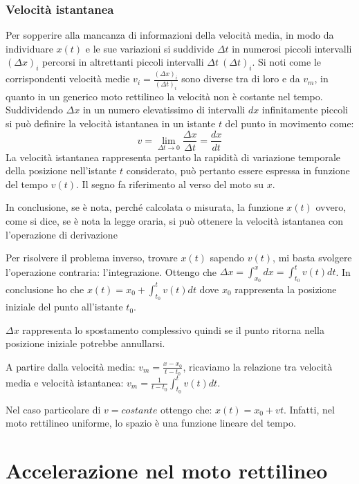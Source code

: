 \documentclass[class=book, crop=false, oneside, 12pt]{standalone}
\begin{document}
    \subsubsection{Velocit\`a istantanea}
    Per sopperire alla mancanza di informazioni della velocit\`a media, in modo da individuare \(x(t)\) e le sue variazioni si suddivide \(\Delta t\) in numerosi piccoli intervalli \((\Delta x)_i\) percorsi in altrettanti piccoli intervalli $\Delta t\ (\Delta t)_i$.
    Si noti come le corrispondenti velocit\`a medie $v_i=\frac{(\Delta x)_i}{(\Delta t)_i}$ sono diverse tra di loro e da $v_m$, in quanto in un generico moto rettilineo la velocit\`a non \`e costante nel tempo.
    Suddividendo $\Delta x$ in un numero elevatissimo di intervalli $dx$ infinitamente piccoli si pu\`o definire la velocit\`a istantanea in un istante $t$ del punto in movimento come:
    \begin{equation*}
      v=\lim\limits_{\Delta t\rightarrow 0}\dfrac{\Delta x}{\Delta t}=\dfrac{dx}{dt}
    \end{equation*}
    La velocit\`a istantanea rappresenta pertanto la rapidit\`a di variazione temporale della posizione nell'istante $t$ considerato, pu\`o pertanto essere espressa in funzione del tempo $v(t)$.
    Il segno fa riferimento al verso del moto su $x$.

In conclusione, se è nota, perché calcolata o misurata, la funzione
\(x(t)\) ovvero, come si dice, se è nota la legge oraria, si può
ottenere la velocità istantanea con l'operazione di derivazione

Per risolvere il problema inverso, trovare \(x(t)\) sapendo \(v(t)\), mi
basta svolgere l'operazione contraria: l'integrazione. Ottengo che
\(\Delta x = \int_{x_0}^{x} dx = \int_{t_0}^{t} v(t) dt\). In
conclusione ho che \(x(t) = x_0 + \int_{t_0}^t v(t) dt\) dove \(x_0\)
rappresenta la posizione iniziale del punto all'istante \(t_0\).

\(\Delta x\) rappresenta lo spostamento complessivo quindi se il punto
ritorna nella posizione iniziale potrebbe annullarsi.

A partire dalla velocità media: \(v_m = \frac {x-x_0} {t-t_0}\),
ricaviamo la relazione tra velocità media e velocità istantanea:
\(v_m = \frac {1} {t-t_0} \int_{t_0}^t v(t) dt\).

Nel caso particolare di \(v = costante\) ottengo che:
\(x(t) = x_0 + vt\). Infatti, nel moto rettilineo uniforme, lo spazio è
una funzione lineare del tempo.

\section{Accelerazione nel moto rettilineo}
\end{document}
